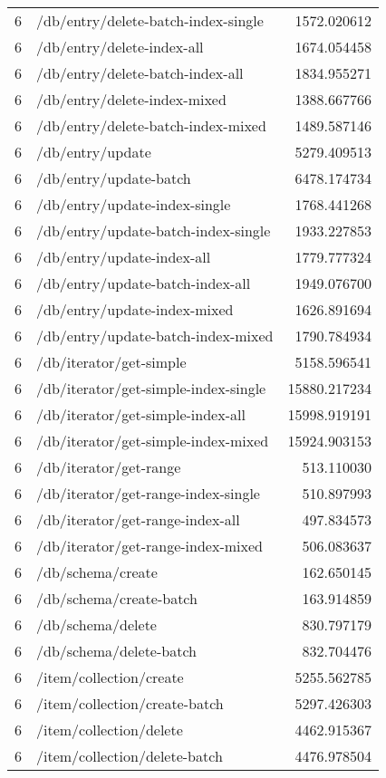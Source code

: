 \begin{longtable}{rlr}
6 & /db/entry/delete-batch-index-single & 1572.020612 \\
6 & /db/entry/delete-index-all & 1674.054458 \\
6 & /db/entry/delete-batch-index-all & 1834.955271 \\
6 & /db/entry/delete-index-mixed & 1388.667766 \\
6 & /db/entry/delete-batch-index-mixed & 1489.587146 \\
6 & /db/entry/update & 5279.409513 \\
6 & /db/entry/update-batch & 6478.174734 \\
6 & /db/entry/update-index-single & 1768.441268 \\
6 & /db/entry/update-batch-index-single & 1933.227853 \\
6 & /db/entry/update-index-all & 1779.777324 \\
6 & /db/entry/update-batch-index-all & 1949.076700 \\
6 & /db/entry/update-index-mixed & 1626.891694 \\
6 & /db/entry/update-batch-index-mixed & 1790.784934 \\
6 & /db/iterator/get-simple & 5158.596541 \\
6 & /db/iterator/get-simple-index-single & 15880.217234 \\
6 & /db/iterator/get-simple-index-all & 15998.919191 \\
6 & /db/iterator/get-simple-index-mixed & 15924.903153 \\
6 & /db/iterator/get-range & 513.110030 \\
6 & /db/iterator/get-range-index-single & 510.897993 \\
6 & /db/iterator/get-range-index-all & 497.834573 \\
6 & /db/iterator/get-range-index-mixed & 506.083637 \\
6 & /db/schema/create & 162.650145 \\
6 & /db/schema/create-batch & 163.914859 \\
6 & /db/schema/delete & 830.797179 \\
6 & /db/schema/delete-batch & 832.704476 \\
6 & /item/collection/create & 5255.562785 \\
6 & /item/collection/create-batch & 5297.426303 \\
6 & /item/collection/delete & 4462.915367 \\
6 & /item/collection/delete-batch & 4476.978504 \\

\end{longtable}
